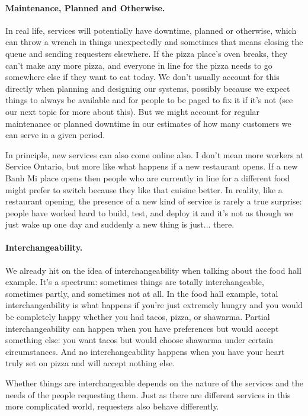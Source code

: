 \documentclass[a4paper]{report}
\begin{document}
\paragraph{Maintenance, Planned and Otherwise.}
In real life, services will potentially have downtime, planned or otherwise, which can throw a wrench in things unexpectedly and sometimes that means closing the queue and sending requesters elsewhere. If the pizza place's oven breaks, they can't make any more pizza, and everyone in line for the pizza needs to go somewhere else if they want to eat today. We don't usually account for this directly when planning and designing our systems, possibly because we expect things to always be available and for people to be paged to fix it if it's not (see our next topic for more about this). But we might account for regular maintenance or planned downtime in our estimates of how many customers we can serve in a given period.

In principle, new services can also come online also. I don't mean more workers at Service Ontario, but more like what happens if a new restaurant opens. If a new Banh Mi place opens then people who are currently in line for a different food might prefer to switch because they like that cuisine better. In reality, like a restaurant opening, the presence of a new kind of service is rarely a true surprise: people have worked hard to build, test, and deploy it and it's not as though we just wake up one day and suddenly a new thing is just... there.

\paragraph{Interchangeability.} We already hit on the idea of interchangeability when talking about the food hall example. It's a spectrum: sometimes things are totally interchangeable, sometimes partly, and sometimes not at all. In the food hall example, total interchangeability is what happens if you're just extremely hungry and you would be completely happy whether you had tacos, pizza, or shawarma.  Partial interchangeability can happen when you have preferences but would accept something else: you want tacos but would choose shawarma under certain circumstances. And no interchangeability happens when you have your heart truly set on pizza and will accept nothing else.

Whether things are interchangeable depends on the nature of the services and the needs of the people requesting them. Just as there are different services in this more complicated world, requesters also behave differently.
\end{document}
